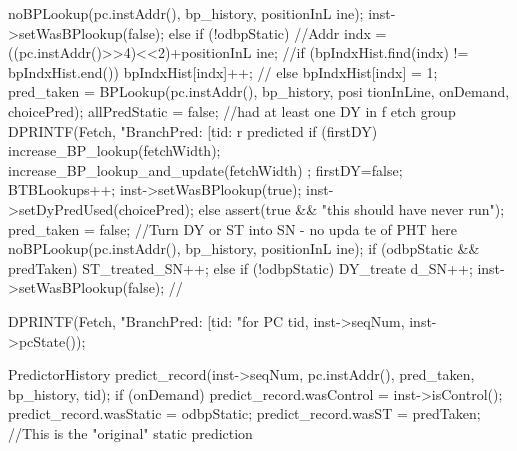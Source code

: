 \begin{DoxyCode}
{{{{                                noBPLookup(pc.instAddr(), bp_history, positionInL
      ine);
                                inst->setWasBPlookup(false);
                        }
                        else if (!odbpStatic)
                        {
                                //Addr indx = ((pc.instAddr()>>4)<<2)+positionInL
      ine;
                                //if (bpIndxHist.find(indx) != bpIndxHist.end()) 
      { bpIndxHist[indx]++;
                                //} else { bpIndxHist[indx] = 1; }
                            pred_taken = BPLookup(pc.instAddr(), bp_history, posi
      tionInLine, onDemand, choicePred);
                                allPredStatic = false; //had at least one DY in f
      etch group
                            DPRINTF(Fetch, "BranchPred: [tid:%
      r predicted %
                                if (firstDY) {
                                        increase_BP_lookup(fetchWidth);
                                        increase_BP_lookup_and_update(fetchWidth)
      ;
                                        firstDY=false;
                                }
                                BTBLookups++;
                                inst->setWasBPlookup(true);
                                inst->setDyPredUsed(choicePred);
                        } else {
                                assert(true && "this should have never run");
                            pred_taken = false; //Turn DY or ST into SN - no upda
      te of PHT here
                                noBPLookup(pc.instAddr(), bp_history, positionInL
      ine);
                                if (odbpStatic && predTaken)    ST_treated_SN++;
                                else if (!odbpStatic)                   DY_treate
      d_SN++;
                                inst->setWasBPlookup(false);
                        }
        }
    //}

    DPRINTF(Fetch, "BranchPred: [tid:%
                "for PC %
            tid, inst->seqNum, inst->pcState());

    PredictorHistory predict_record(inst->seqNum, pc.instAddr(),
                                    pred_taken, bp_history, tid);
        if (onDemand) {
                predict_record.wasControl = inst->isControl();
                predict_record.wasStatic = odbpStatic;
                predict_record.wasST = predTaken; //This is the "original" static
       prediction
        }

}
\end{DoxyCode}
